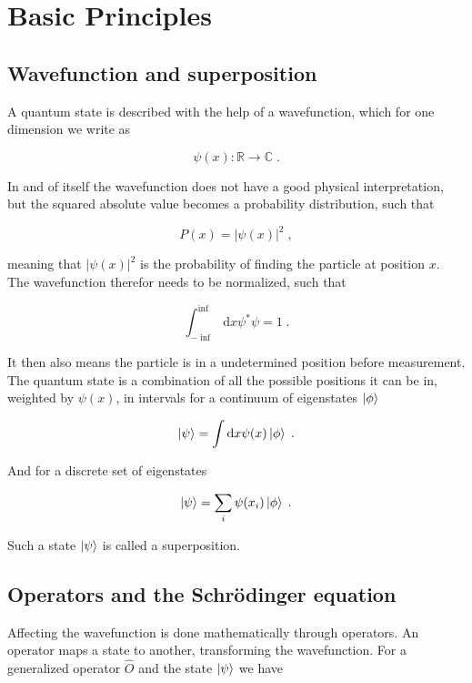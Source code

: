 \section{Basic Principles}
\subsection{Wavefunction and superposition}

A quantum state is described with the help of a wavefunction, which for one dimension we write as

$$\psi(x): \mathbb{R}\rightarrow\mathbb{C} \; .$$

In and of itself the wavefunction does not have a good physical interpretation, but the squared absolute value becomes a probability distribution, such that

\begin{equation}
    P(x) = |\psi(x)|^2 \; ,
\end{equation}

meaning that $|\psi(x)|^2$ is the probability of finding the particle at position $x$. The wavefunction therefor needs to be normalized, such that 

\begin{equation}
    \int_{-\inf}^{\inf}\mathrm{d}x \psi^*\psi = 1 \; .
\end{equation}

It then also means the particle is in a undetermined position before measurement. The quantum state is a combination of all the possible positions it can be in, weighted by $\psi(x)$, in intervals for a continuum of eigenstates $\ket{\phi}$ 

\begin{equation}
    \ket{\psi} = \int\mathrm{d}x \psi(x)\ket{\phi} \; .
\end{equation}

And for a discrete set of eigenstates

\begin{equation}
    \ket{\psi} = \sum_i \psi(x_i)\ket{\phi} \; .
\end{equation}

Such a state $\ket{\psi}$ is called a superposition.

\subsection{Operators and the Schrödinger equation}

Affecting the wavefunction is done mathematically through operators. An operator maps a state to another, transforming the wavefunction. For a generalized operator $\hat{O}$ and the state $\ket{\psi}$ we have

